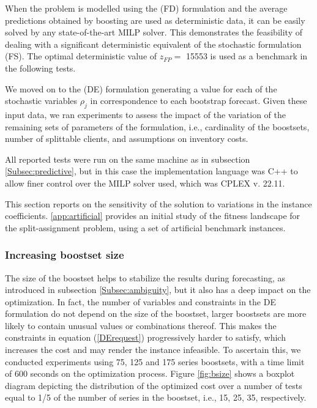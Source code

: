 \documentclass[a4paper,fleqn,3p,11pt,authoryear]{cas-sc}
\begin{document}
When the problem is modelled using the (FD) formulation and the average predictions obtained by boosting are used as deterministic data, it can be easily solved by any state-of-the-art MILP solver. This demonstrates the feasibility of dealing with a significant deterministic equivalent of the stochastic formulation (FS). The optimal deterministic value of $z_{FP} =$ 15553 is used as a benchmark in the following tests.

We moved on to the (DE) formulation generating a value for each of the stochastic variables $\rho_j$ in correspondence to each bootstrap forecast.
Given these input data, we ran experiments to assess the impact of the variation of the remaining sets of parameters of the formulation, i.e., cardinality of the boostsets, number of splittable clients, and assumptions on inventory costs. 

All reported tests were run on the same machine as in subsection \ref{Subsec:predictive}, but in this case the implementation language was C++ to allow finer control over the MILP solver used, which was CPLEX v. 22.11.

This section reports on the sensitivity of the solution to variations in the instance coefficients. \ref{app:artificial} provides an initial study of the fitness landscape for the split-assignment problem, using a set of artificial benchmark instances.

\subsubsection*{Increasing boostset size}

The size of the boostset helps to stabilize the results during forecasting, as introduced in subsection \ref{Subsec:ambiguity}, but it also has a deep impact on the optimization. In fact, the number of variables and constraints in the DE formulation do not depend on the size of the boostset, larger boostsets are more likely to contain unusual values or combinations thereof. This makes the constraints in equation (\ref{DErequest}) progressively harder to satisfy, which increases the cost and may render the instance infeasible.
To ascertain this, we conducted experiments using 75, 125 and 175 series boostsets, with a time limit of 600 seconds on the optimization process. Figure \ref{fig:bsize} shows a boxplot diagram depicting the distribution of the optimized cost over a number of tests equal to 1/5 of the number of series in the boostset, i.e., 15, 25, 35, respectively.
\end{document}
